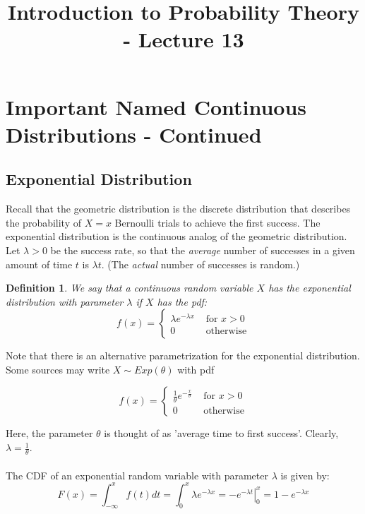 \documentclass[12pt]{article} %
\date{}
\title{Introduction to Probability Theory - Lecture 13}
\newtheorem{defn}{Definition}
\begin{document}
\maketitle

\section{Important Named Continuous Distributions - Continued}
\subsection{Exponential Distribution}
Recall that the geometric distribution is the discrete distribution that describes the probability of $X=x$ Bernoulli trials to achieve the first success. The exponential distribution is the continuous analog of the geometric distribution. Let $\lambda >0$ be the success rate, so that the \emph{average} number of successes in a given amount of time $t$ is $\lambda t$. (The \emph{actual} number of successes is random.)
\begin{defn}
We say that a continuous random variable $X$ has the exponential distribution with parameter $\lambda$ if $X$ has the pdf:
$$f(x) =\left\{\begin{matrix}
\lambda e^{-\lambda x} &\textrm{ for } x>0\\
0&\textrm{ otherwise}
\end{matrix}\right.$$
\end{defn}
Note that there is an alternative parametrization for the exponential distribution. Some sources may write $X\sim Exp(\theta)$ with pdf

$$f(x) =\left\{\begin{matrix}
\frac{1}{\theta} e^{-\frac{x}{\theta}} &\textrm{ for } x>0\\
0&\textrm{ otherwise}
\end{matrix}\right.$$

Here, the parameter $\theta$ is thought of as 'average time to first success'. Clearly, $\lambda = \frac1\theta$.\\\\
The CDF of an exponential random variable with parameter $\lambda$ is given by:
$$F(x) = \int_{-\infty}^{x} f(t)dt =  \int_{0}^{x} \lambda e^{-\lambda x} = \left.-e^{-\lambda t}\right\rvert_0^x = 1-e^{-\lambda x}$$ 
\end{document}
